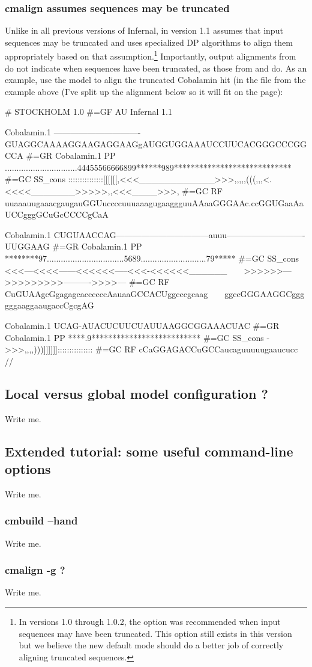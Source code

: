 \subsubsection{cmalign assumes sequences may be truncated}
Unlike in all previous versions of Infernal,  in version
1.1 assumes that input sequences may be truncated and uses specialized
DP algorithms to align them appropriately based on that
assumption.\footnote{In versions 1.0 through 1.0.2, the 
   option was recommended when input sequences may have
  been truncated. This option still exists in this version but we
  believe the new default mode should do a better job of correctly
  aligning truncated sequences.} Importantly, output alignments from
 do not indicate when sequences have been truncated, as
those from  and  do. As an example, use
the  model to align the truncated
Cobalamin hit (in the file  from the
 example above (I've split up the alignment below so it
will fit on the page):


\begin{sreoutput}
# STOCKHOLM 1.0
#=GF AU Infernal 1.1

Cobalamin.1         -------------------------------GUAGGCAAAAGGAAGAGGAAGgAUGGUGGAAAUCCUUCACGGGCCCGGCCA
#=GR Cobalamin.1 PP ...............................44455566666899******989****************************
#=GC SS_cons        :::::::::::::::[[[[[[,<<<____________>>>,,,,,(((,,,<.<<<<_______>>>>>,,<<<____>>>,
#=GC RF             uuaaauugaaacgaugauGGUuccccuuuaaagugaaggguuAAaaGGGAAc.ccGGUGaaAaUCCgggGCuGcCCCCgCaA

Cobalamin.1         CUGUAACCAG---------------------------------auuu----------------------------UUGGAAG
#=GR Cobalamin.1 PP ********97.................................5689............................79*****
#=GC SS_cons        <<<---<<<<------<<<<<<-----<<<-<<<<<<______~~~~>>>>>>--->>>>>>>>>---------->>>>---
#=GC RF             CuGUAAgcGgagagcaccccccAauaaGCCACUggcccgcaag~~~~ggccGGGAAGGCggggggaaggaaugaccCgcgAG

Cobalamin.1         UCAG-AUACUCUUCUAUUAAGGCGGAAACUAC
#=GR Cobalamin.1 PP ****.9**************************
#=GC SS_cons        ->>>,,,,)))]]]]]]:::::::::::::::
#=GC RF             cCaGGAGACCuGCCaucaguuuuugaaucucc
//
\end{sreoutput}


\subsection{Local versus global model configuration ? }
Write me.

\subsection{Extended tutorial: some useful command-line options}
Write me.

\subsubsection{cmbuild --hand}
Write me.

\subsubsection{cmalign -g ? }
Write me.


